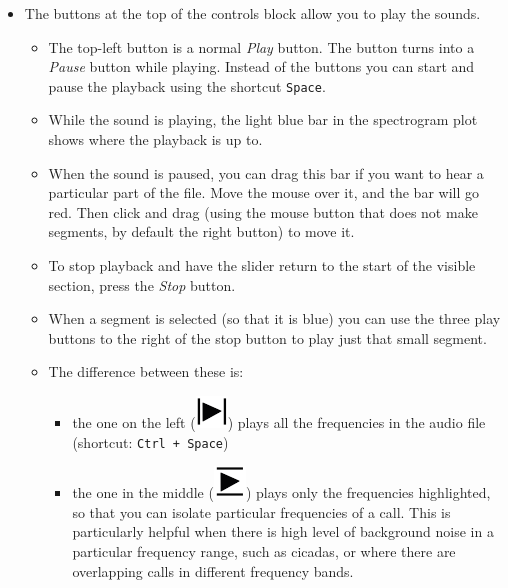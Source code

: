 \documentclass{scrartcl}
\begin{document}
\begin{itemize}
	\item The buttons at the top of the controls block allow you to play the sounds. 

\begin{itemize}
	\item The top-left button is a normal \textit{Play} button. The button turns into a \textit{Pause} button while playing. Instead of the buttons you can start and pause the playback using the shortcut \texttt{Space}.
	\item While the sound is playing, the light blue bar in the spectrogram plot shows where the playback is up to. 
	\item When the sound is paused, you can drag this bar if you want to hear a particular part of the file. Move the mouse over it, and the bar will go red. Then click and drag (using the mouse button that does not make segments, by default the right button) to move it. 
	\item To stop playback and have the slider return to the start of the visible section, press the \textit{Stop} button.
	\item When a segment is selected (so that it is blue) you can use the three play buttons to the right of the stop button to play just that small segment. 
	\item The difference between these is:
	    \begin{itemize} 
		    \item the one on the left (\includegraphics[scale=0.3]{Figures/playsegment}) plays all the frequencies in the audio file (shortcut: \texttt{Ctrl + Space})
		    \item the one in the middle (\includegraphics[scale=0.3]{Figures/playBandLimited}) plays only the frequencies highlighted, so that you can isolate particular frequencies of a call. This is particularly helpful when there is high level of background noise in a particular frequency range, such as cicadas, or where there are overlapping calls in different frequency bands.

\end{itemize}
\end{itemize}
\end{itemize}
\end{document}
